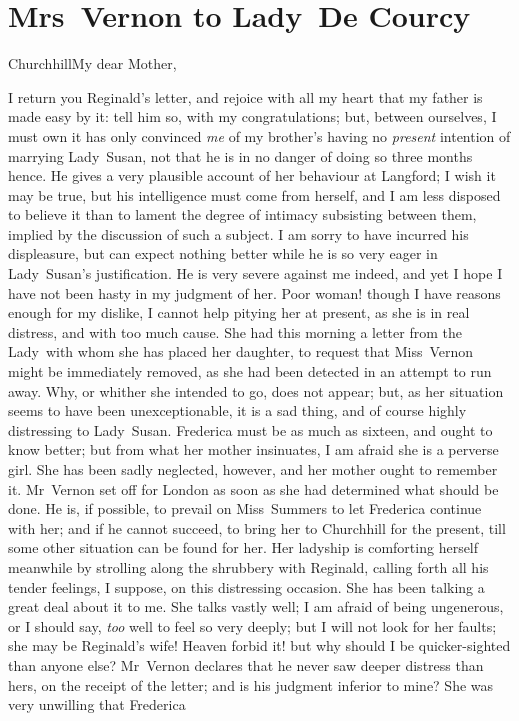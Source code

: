 \chapter{Mrs~Vernon to Lady~De Courcy}
  
  	\begin{a4}
	\vspace{5em}
	\end{a4}
	
	\begin{letter}
	\vspace{5em}
	\end{letter}
	
  \begin{mail}{Churchhill}{My dear Mother,}

I return you Reginald's letter, and rejoice with all my heart that my father is made easy by it: tell him so, with my congratulations; but, between ourselves, I must own it has only convinced \textit{me} of my brother's having no \textit{present} intention of marrying Lady~Susan, not that he is in no danger of doing so three months hence. He gives a very plausible account of her behaviour at Langford; I wish it may be true, but his intelligence must come from herself, and I am less disposed to believe it than to lament the degree of intimacy subsisting between them, implied by the discussion of such a subject. I am sorry to have incurred his displeasure, but can expect nothing better while he is so very eager in Lady~Susan's justification. He is very severe against me indeed, and yet I hope I have not been hasty in my judgment of her. Poor woman! though I have reasons enough for my dislike, I cannot help pitying her at present, as she is in real distress, and with too much cause. She had this morning a letter from the Lady~with whom she has placed her daughter, to request that Miss~Vernon might be immediately removed, as she had been detected in an attempt to run away. Why, or whither she intended to go, does not appear; but, as her situation seems to have been unexceptionable, it is a sad thing, and of course highly distressing to Lady~Susan. Frederica must be as much as sixteen, and ought to know better; but from what her mother insinuates, I am afraid she is a perverse girl. She has been sadly neglected, however, and her mother ought to remember it. Mr~Vernon set off for London as soon as she had determined what should be done. He is, if possible, to prevail on Miss~Summers to let Frederica continue with her; and if he cannot succeed, to bring her to Churchhill for the present, till some other situation can be found for her. Her ladyship is comforting herself meanwhile by strolling along the shrubbery with Reginald, calling forth all his tender feelings, I suppose, on this distressing occasion. She has been talking a great deal about it to me. She talks vastly well; I am afraid of being ungenerous, or I should say, \textit{too} well to feel so very deeply; but I will not look for her faults; she may be Reginald's wife! Heaven forbid it! but why should I be quicker-sighted than anyone else? Mr~Vernon declares that he never saw deeper distress than hers, on the receipt of the letter; and is his judgment inferior to mine? She was very unwilling that Frederica 
\end{mail}
